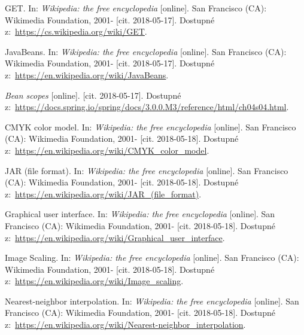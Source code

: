 \documentclass[a4paper,12pt]{article}
\begin{document}
{  GET. In: \textit{Wikipedia: the free encyclopedia} [online]. San Francisco (CA): Wikimedia Foundation, 2001- [cit. 2018-05-17]. Dostupné z:~\url{https://cs.wikipedia.org/wiki/GET}.
  
  JavaBeans. In: \textit{Wikipedia: the free encyclopedia} [online]. San Francisco (CA): Wikimedia Foundation, 2001- [cit. 2018-05-17]. Dostupné z:~\url{https://en.wikipedia.org/wiki/JavaBeans}.
  
  \textit{Bean scopes} [online]. [cit. 2018-05-17]. Dostupné z:~\url{https://docs.spring.io/spring/docs/3.0.0.M3/reference/html/ch04s04.html}.
  
  CMYK color model. In: \textit{Wikipedia: the free encyclopedia} [online]. San Francisco (CA): Wikimedia Foundation, 2001- [cit. 2018-05-18]. Dostupné z:~\url{https://en.wikipedia.org/wiki/CMYK_color_model}.
  
  JAR (file format). In: \textit{Wikipedia: the free encyclopedia} [online]. San Francisco (CA): Wikimedia Foundation, 2001- [cit. 2018-05-18]. Dostupné z:~\url{https://en.wikipedia.org/wiki/JAR_(file_format)}.
  
  Graphical user interface. In: \textit{Wikipedia: the free encyclopedia} [online]. San Francisco (CA): Wikimedia Foundation, 2001- [cit. 2018-05-18]. Dostupné z:~\url{https://en.wikipedia.org/wiki/Graphical_user_interface}.
  
  Image Scaling. In: \textit{Wikipedia: the free encyclopedia} [online]. San Francisco (CA): Wikimedia Foundation, 2001- [cit. 2018-05-18]. Dostupné z:~\url{https://en.wikipedia.org/wiki/Image_scaling}.
  
  Nearest-neighbor interpolation. In: \textit{Wikipedia: the free encyclopedia} [online]. San Francisco (CA): Wikimedia Foundation, 2001- [cit. 2018-05-18]. Dostupné z:~\url{https://en.wikipedia.org/wiki/Nearest-neighbor_interpolation}.
  
}



\end{document}
